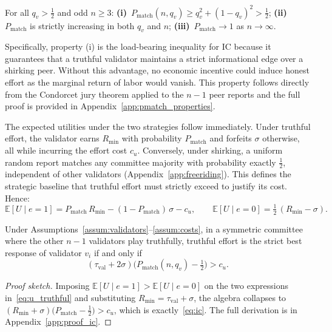 \begin{proposition}
\label{prop:pmatch_properties}
For all $q_v > \tfrac{1}{2}$ and odd $n \geq 3$: \textbf{(i)}~$P_{\text{match}}(n, q_v) \geq q_v^2 + (1-q_v)^2 > \tfrac{1}{2}$; \textbf{(ii)}~$P_{\text{match}}$ is strictly increasing in both $q_v$ and $n$; \textbf{(iii)}~$P_{\text{match}} \to 1$ as $n \to \infty$.
\end{proposition}
\noindent Specifically, property (i) is the load-bearing inequality for IC because it guarantees that a truthful validator maintains a strict informational edge over a shirking peer. Without this advantage, no economic incentive could induce honest effort as the marginal return of labor would vanish. This property follows directly from the Condorcet jury theorem applied to the $n-1$ peer reports and the full proof is provided in Appendix~\ref{app:pmatch_properties}.

The expected utilities under the two strategies follow immediately. Under truthful effort, the validator earns $R_{\min}$ with probability $P_{\text{match}}$ and forfeits $\sigma$ otherwise, all while incurring the effort cost $c_u$. Conversely, under shirking, a uniform random report matches any committee majority with probability exactly $\tfrac{1}{2}$, independent of other validators (Appendix~\ref{app:freeriding}). This defines the strategic baseline that truthful effort must strictly exceed to justify its cost. Hence:
\begin{equation}
\label{eq:u_truthful}
\mathbb{E}[U \mid e=1] = P_{\text{match}}\,R_{\min} - (1-P_{\text{match}})\,\sigma - c_u, \qquad \mathbb{E}[U \mid e=0] = \tfrac{1}{2}\,(R_{\min} - \sigma).
\end{equation}

\begin{theorem}[Validator IC]
\label{Strict IC for Validators}
Under Assumptions~\ref{assum:validators}--\ref{assum:costs}, in a symmetric committee where the other $n-1$ validators play truthfully, truthful effort is the strict best response of validator $v_i$ if and only if
\begin{equation}
\label{eq:ic}
(\tau_{\text{val}} + 2\sigma)\Big(P_{\text{match}}(n, q_v) - \tfrac{1}{2}\Big) > c_u.
\end{equation}
\end{theorem}

\begin{proof}[Proof sketch]
Imposing $\mathbb{E}[U\mid e=1] > \mathbb{E}[U\mid e=0]$ on the two expressions in~\eqref{eq:u_truthful} and substituting $R_{\min} = \tau_{\text{val}}+\sigma$, the algebra collapses to $(R_{\min}+\sigma)\bigl(P_{\text{match}}-\tfrac{1}{2}\bigr) > c_u$, which is exactly~\eqref{eq:ic}. The full derivation is in Appendix~\ref{app:proof_ic}.
\end{proof}

